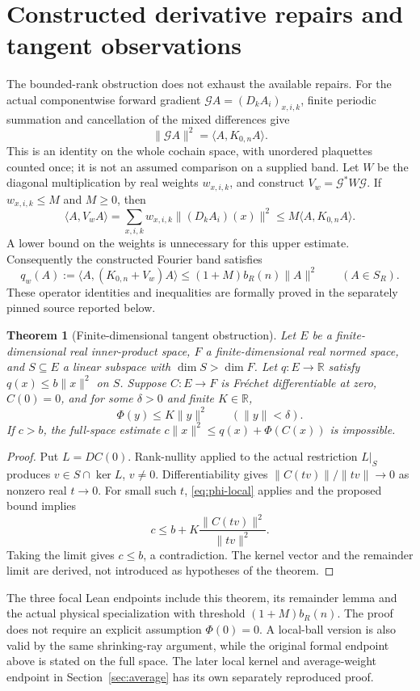 \documentclass[11pt]{article}
\newtheorem{theorem}{Theorem}[section]
\newcommand{\R}{\mathbb R}
\newcommand{\ip}[2]{\langle #1,#2\rangle}
\begin{document}
\section{Constructed derivative repairs and tangent observations}\label{sec:tangent}
The bounded-rank obstruction does not exhaust the available repairs. For the
actual componentwise forward gradient $\mathcal G A=(D_k A_i)_{x,i,k}$, finite
periodic summation and cancellation of the mixed differences give
\[
 \|\mathcal G A\|^2=\ip{A}{K_{0,n}A}.
\]
This is an identity on the whole cochain space, with unordered plaquettes
counted once; it is not an assumed comparison on a supplied band. Let $W$ be
the diagonal multiplication by real weights $w_{x,i,k}$, and construct
$V_w=\mathcal G^*W\mathcal G$. If $w_{x,i,k}\le M$ and $M\ge0$, then
\begin{equation}\label{eq:weighted-actual}
 \ip{A}{V_w A}=\sum_{x,i,k}w_{x,i,k}\|(D_k A_i)(x)\|^2
 \le M\ip{A}{K_{0,n}A}.
\end{equation}
A lower bound on the weights is unnecessary for this upper estimate.
Consequently the constructed Fourier band satisfies
\[
 q_w(A):=\ip{A}{(K_{0,n}+V_w)A}
 \le (1+M)b_R(n)\|A\|^2 \qquad(A\in S_R).
\]
These operator identities and inequalities are formally proved in the
separately pinned source reported below.

\begin{theorem}[Finite-dimensional tangent obstruction]\label{thm:tangent}
Let $E$ be a finite-dimensional real inner-product space, $F$ a finite-dimensional
real normed space, and $S\subseteq E$ a linear subspace with $\dim S>\dim F$.
Let $q:E\to\R$ satisfy $q(x)\le b\|x\|^2$ on $S$. Suppose $C:E\to F$ is
Fr\'echet differentiable at zero, $C(0)=0$, and for some $\delta>0$ and finite
$K\in\R$,
\begin{equation}\label{eq:phi-local}
 \Phi(y)\le K\|y\|^2\qquad(\|y\|<\delta).
\end{equation}
If $c>b$, the full-space estimate
$c\|x\|^2\le q(x)+\Phi(C(x))$ is impossible.
\end{theorem}
\begin{proof}
Put $L=DC(0)$. Rank-nullity applied to the actual restriction $L|_S$ produces
$v\in S\cap\ker L$, $v\ne0$. Differentiability gives
$\|C(tv)\|/\|tv\|\to0$ as nonzero real $t\to0$. For small such $t$,
\eqref{eq:phi-local} applies and the proposed bound implies
\[
 c\le b+K\frac{\|C(tv)\|^2}{\|tv\|^2}.
\]
Taking the limit gives $c\le b$, a contradiction. The kernel vector and the
remainder limit are derived, not introduced as hypotheses of the theorem.
\end{proof}
The three focal Lean endpoints include this theorem, its remainder lemma and
the actual physical specialization with threshold $(1+M)b_R(n)$. The proof
does not require an explicit assumption $\Phi(0)=0$. A local-ball version is
also valid by the same shrinking-ray argument, while the original formal endpoint above is stated on the full space. The later local kernel and average-weight endpoint in Section~\ref{sec:average} has its own separately reproduced proof.
\end{document}
